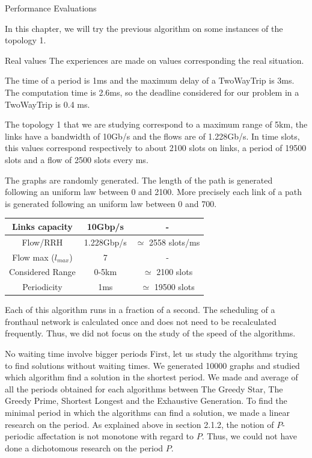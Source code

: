 \documentclass[a4paper,10pt]{report}
\begin{document}
\begin{chapter}{Performance Evaluations}

In this chapter, we will try the previous algorithm on some instances of the topology 1.

\begin{section}{Real values}
 The experiences are made on values corresponding the real situation.
  
  The time of a period is 1ms and the maximum delay of a TwoWayTrip is 3ms. The computation time is 2.6ms, so the deadline considered for our problem in a TwoWayTrip is 0.4 ms.
  
 The topology 1 that we are studying correspond to a maximum range of 5km, the links have a bandwidth of 10Gb/s and the flows are of 1.228Gb/s.
 In time slots, this values correspond respectively to about 2100 slots on links, a period of 19500 slots and a flow of 2500 slots every ms.
 
 The graphs are randomly generated. The length of the path is generated following an uniform law between 0 and 2100. More precisely
 each link of a path is generated following an uniform law between 0 and 700.
 
 \centering
  \begin{tabular}{|c|c|c|}
  \hline
   Links capacity & 10Gbp/s & -\\
   \hline
   Flow/RRH & 1.228Gbp/s & $\simeq$ 2558 slots/ms\\
   \hline
   Flow max ($l_{max}$) & 7 & -\\
   \hline
   Considered Range & 0-5km & $\simeq$ 2100 slots\\
   \hline
   Periodicity & 1ms & $\simeq$ 19500 slots\\
   \hline
   \end{tabular}
  
Each of this algorithm runs in a fraction of a second. The scheduling of a fronthaul network is calculated once and does not 
need to be recalculated frequently. Thus, we did not focus on the study of the speed of the algorithms.
\end{section}

\begin{section}{No waiting time involve bigger periods}
First, let us study the algorithms trying to find solutions without waiting times.
We generated 10000 graphs and studied which algorithm find a solution in the shortest period. We made and average of all the periods obtained for each algorithms
between The Greedy Star, The Greedy Prime, Shortest Longest and the Exhaustive Generation.
To find the minimal period in which the algorithms can find a solution, we made a linear research on the period. As explained above in section 2.1.2, the notion of $P$-periodic affectation is not monotone with regard to $P$. Thus, we could not have done a dichotomous research on the period $P$.


\end{section}
\end{chapter}
\end{document}
